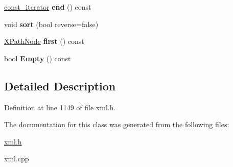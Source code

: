 \begin{DoxyCompactItemize}
\item 
\hypertarget{classphys_1_1xml_1_1XPathNodeSet_adc1ab904e2122928837cc02f1b0a54bf}{
\hyperlink{classphys_1_1xml_1_1XPathNode}{const\_\-iterator} {\bfseries end} () const }
\label{de/dc2/classphys_1_1xml_1_1XPathNodeSet_adc1ab904e2122928837cc02f1b0a54bf}

\item 
\hypertarget{classphys_1_1xml_1_1XPathNodeSet_ad18d6b92f885ee9d862f5008af734559}{
void {\bfseries sort} (bool reverse=false)}
\label{de/dc2/classphys_1_1xml_1_1XPathNodeSet_ad18d6b92f885ee9d862f5008af734559}

\item 
\hypertarget{classphys_1_1xml_1_1XPathNodeSet_a7d3c2d75f154b863a8e81d32e4662b78}{
\hyperlink{classphys_1_1xml_1_1XPathNode}{XPathNode} {\bfseries first} () const }
\label{de/dc2/classphys_1_1xml_1_1XPathNodeSet_a7d3c2d75f154b863a8e81d32e4662b78}

\item 
\hypertarget{classphys_1_1xml_1_1XPathNodeSet_a77e87e2a776cf28501d284532f60e74a}{
bool {\bfseries Empty} () const }
\label{de/dc2/classphys_1_1xml_1_1XPathNodeSet_a77e87e2a776cf28501d284532f60e74a}

\end{DoxyCompactItemize}


\subsection{Detailed Description}


Definition at line 1149 of file xml.h.



The documentation for this class was generated from the following files:\begin{DoxyCompactItemize}
\item 
\hyperlink{xml_8h}{xml.h}\item 
xml.cpp\end{DoxyCompactItemize}
